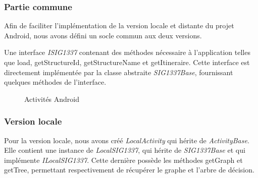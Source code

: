
\subsubsection{Partie commune}

Afin de faciliter l'implémentation de la version locale et distante du projet Android,
nous avons défini un socle commun aux deux versions.

Une interface \textit{ISIG1337} contenant des méthodes nécessaire à l'application telles que load,
getStructureId, getStructureName et getItineraire.
Cette interface est directement implémentée par la classe abstraite \textit{SIG1337Base},
fournissant quelques méthodes de l'interface.

\begin{figure}[H]
\centering
{}
\caption{Activités Android}
\end{figure}


\subsubsection{Version locale}

Pour la version locale, nous avons créé \textit{LocalActivity} qui hérite de \textit{ActivityBase}.
Elle contient une instance de \textit{LocalSIG1337}, qui hérite de \textit{SIG1337Base} et qui implémente \textit{ILocalSIG1337}.
Cette dernière possède les méthodes getGraph et getTree, permettant respectivement de récupérer le graphe et l'arbre de décision.

